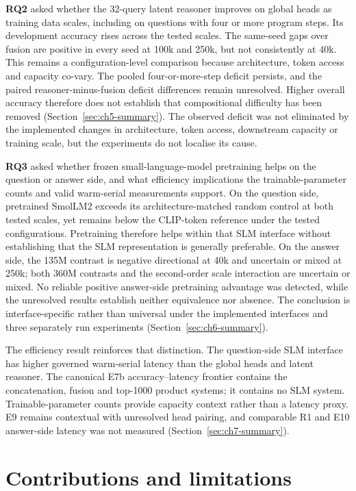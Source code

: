 \textbf{RQ2} asked whether the 32-query latent reasoner improves on global
heads as training data scales, including on questions with four or more
program steps. Its development accuracy rises across the tested scales. The
same-seed gaps over fusion are positive in every seed at 100k and 250k, but
not consistently at 40k. This remains a configuration-level comparison
because architecture, token access and capacity co-vary. The pooled
four-or-more-step deficit persists, and the paired reasoner-minus-fusion
deficit differences remain unresolved. Higher overall accuracy therefore does
not establish that compositional difficulty has been removed
(Section~\ref{sec:ch5-summary}). The observed deficit was not eliminated by
the implemented changes in architecture, token access, downstream capacity or
training scale, but the experiments do not localise its cause.

\textbf{RQ3} asked whether frozen small-language-model pretraining helps on
the question or answer side, and what efficiency implications the
trainable-parameter counts and valid warm-serial measurements support.
On the question side, pretrained SmolLM2 exceeds its architecture-matched
random control at both tested scales, yet remains below the CLIP-token
reference under the tested configurations. Pretraining therefore helps within
that SLM interface without establishing that the SLM representation is
generally preferable. On the answer side, the 135M contrast is negative
directional at 40k and uncertain or mixed at 250k; both 360M contrasts and the
second-order scale interaction are uncertain or mixed. No reliable positive
answer-side pretraining advantage was detected, while the unresolved results
establish neither equivalence nor absence. The conclusion is
interface-specific rather than universal under the implemented interfaces and
three separately run experiments (Section~\ref{sec:ch6-summary}).

The efficiency result reinforces that distinction. The question-side SLM
interface has higher governed warm-serial latency than the global heads and
latent reasoner. The canonical E7b accuracy--latency frontier contains the
concatenation, fusion and top-1000 product systems; it contains no SLM system.
Trainable-parameter counts provide capacity context rather than a latency
proxy. E9 remains contextual with unresolved head pairing, and comparable R1
and E10 answer-side latency was not measured
(Section~\ref{sec:ch7-summary}).

\section{Contributions and limitations}
\label{sec:ch9-contributions}

